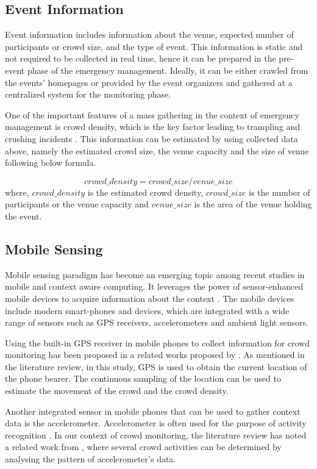\subsection{Event Information}
Event information includes information about the venue, expected number of participants or crowd size, and the type of event. This information is static and not required to be collected in real time, hence it can be prepared in the pre-event phase of the emergency management. Ideally, it can be either crawled from the events' homepages or provided by the event organizers and gathered at a centralized system for the monitoring phase.

One of the important features of a mass gathering in the context of emergency management is crowd density, which is the key factor leading to trampling and crushing incidents \citet{Lee2005}. This information can be estimated by using collected data above, namely the estimated crowd size, the venue capacity and the size of venue following below formula.

\[
crowd\_density = crowd\_size / venue\_size
\]
where, \(crowd\_density\) is the estimated crowd density, \(crowd\_size\) is the number of participants or the venue capacity and \(venue\_size\) is the area of the venue holding the event.

\subsection{Mobile Sensing}

Mobile sensing paradigm has become an emerging topic among recent studies in mobile and context aware computing. It leverages the power of sensor-enhanced mobile devices to acquire information about the context \citep{guo2014participatory}. The mobile devices include modern smart-phones and devices, which are integrated with a wide range of sensors such as GPS receivers, accelerometers and ambient light sensors.

Using the built-in GPS receiver in mobile phones to collect information for crowd monitoring has been proposed in a related works proposed by \citet{Wirz2012}. As mentioned in the literature review, in this study, GPS is used to obtain the current location of the phone bearer. The continuous sampling of the location can be used to estimate the movement of the crowd and the crowd density.

Another integrated sensor in mobile phones that can be used to gather context data is the accelerometer. Accelerometer is often used for the purpose of activity recognition \citep{ravi2005activity, kwapisz2011activity}. In our context of crowd monitoring, the literature review has noted a related work from \citet{Roggen2011}, where several crowd activities can be determined by analysing the pattern of accelerometer's data.

